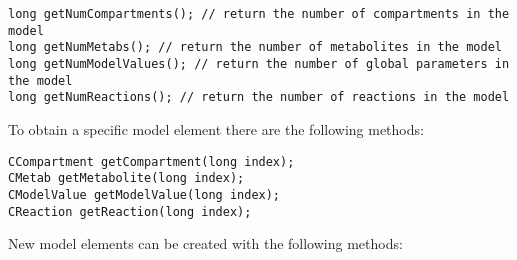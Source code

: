 \documentclass[a4,12pt]{article}
\begin{document}
\begin{lstlisting}
long getNumCompartments(); // return the number of compartments in the model
long getNumMetabs(); // return the number of metabolites in the model
long getNumModelValues(); // return the number of global parameters in the model
long getNumReactions(); // return the number of reactions in the model
\end{lstlisting}

To obtain a specific model element there are the following methods:

\begin{lstlisting}
CCompartment getCompartment(long index);
CMetab getMetabolite(long index);
CModelValue getModelValue(long index);
CReaction getReaction(long index);
\end{lstlisting}

New model elements can be created with the following methods:
\end{document}
